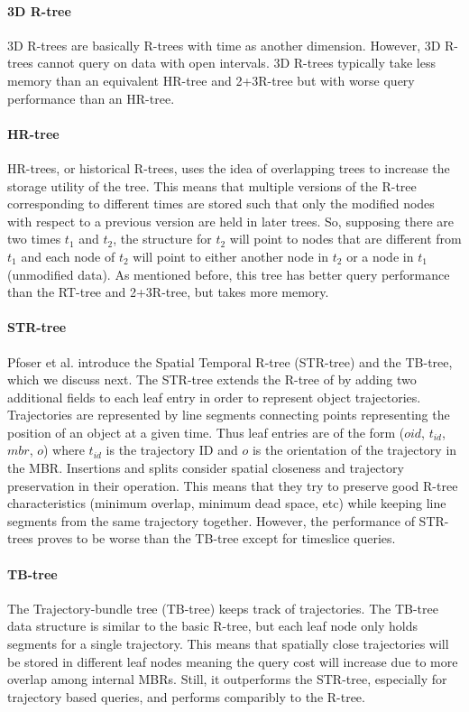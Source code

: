 \paragraph{3D R-tree} 3D R-trees \cite{nascimento1999evaluation} are basically
R-trees with time as another dimension. However, 3D R-trees cannot 
query on data with open intervals. 3D R-trees typically take less
memory than an equivalent HR-tree and 2+3R-tree but with worse query 
performance than an HR-tree.

\paragraph{HR-tree} HR-trees, or historical R-trees, 
\cite{nascimento1999evaluation} uses the idea of overlapping trees to 
increase the storage utility of the tree. This means that multiple 
versions of the R-tree corresponding to different times are stored such 
that only the modified nodes with respect to a previous version are 
held in later trees. So, supposing there are two times $t_1$ and $t_2$, the
structure for $t_2$ will point to nodes that are different from $t_1$ and
each node of $t_2$ will point to either another node in $t_2$ or a node in
$t_1$ (unmodified data). As mentioned before, this tree has better query
performance than the RT-tree and 2+3R-tree, but takes more memory.

\paragraph{STR-tree} Pfoser et al. introduce the Spatial Temporal R-tree 
(STR-tree) and the TB-tree, which we discuss next\cite{pfoser2000novel}. 
The STR-tree extends the R-tree of \cite{guttman84} by adding two additional
fields to each leaf entry in order to represent object trajectories. 
Trajectories are represented by line segments connecting points representing
the position of an object at a given time. Thus leaf entries are of the 
form ($oid$, $t_{id}$, $mbr$, $o$) where $t_{id}$ is the trajectory ID and 
$o$ is the orientation of the trajectory in the MBR. Insertions and splits 
consider spatial closeness and trajectory preservation in their operation.
This means that they try to preserve good R-tree characteristics (minimum 
overlap, minimum dead space, etc) while keeping line segments from the 
same trajectory together. However, the performance of STR-trees proves to
be worse than the TB-tree except for timeslice queries.

\paragraph{TB-tree} The Trajectory-bundle tree (TB-tree) \cite{pfoser2000novel}
keeps track of trajectories. The TB-tree data structure is similar to the 
basic R-tree, but each leaf node only holds segments for a single 
trajectory. This means that spatially close trajectories will be stored in 
different leaf nodes meaning the query cost will increase due to more 
overlap among internal MBRs. Still, it outperforms the STR-tree, especially
for trajectory based queries, and performs comparibly to the R-tree. 

